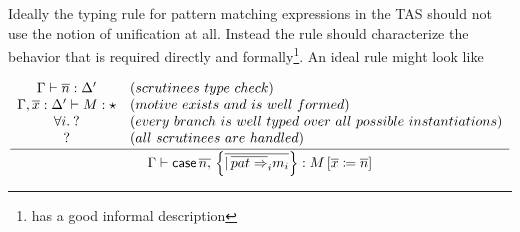 
Ideally the typing rule for pattern matching \case{} expressions in the TAS should not use the notion of unification at all.
Instead the rule should characterize the behavior that is required directly and formally\footnote{\cite{coquand1992pattern} has a good informal description}.
An ideal rule might look like

\[
\frac{\begin{array}{cl}
\Gamma\vdash\overline{n}:\Delta' & (\scruts{}\ type\ check)\\
\Gamma,\overline{x}:\Delta'\vdash M:\star & (motive\ exists\ and\ is\ well\ formed)\\
\forall i.\:? & (every\ branch\ is\ well\ typed\ over\ all\ possible\ instantiations)\\
? & (all\ \scruts{}\ are\ handled)
\end{array}}{\Gamma\vdash \case{} \,\overline{n,}\,\left\{ \overline{|\,\overline{pat\Rightarrow}_{i}m_{i}}\right\} :M\left[\overline{x}\coloneqq\overline{n}\right]}
\]


